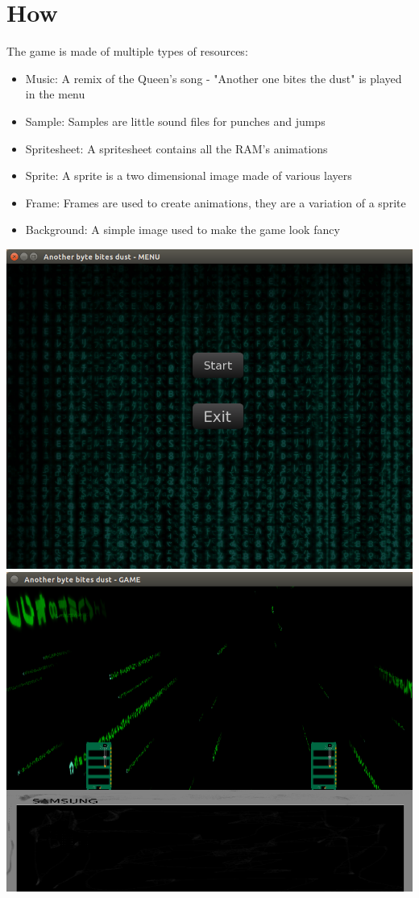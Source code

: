 \documentclass[12pt]{report}
\begin{document}
\section{How}
The game is made of multiple types of resources:
\begin{itemize}
\item Music: A remix of the Queen's song - "Another one bites the dust" is played in the menu
\item Sample: Samples are little sound files for punches and jumps
\item Spritesheet: A spritesheet contains all the RAM's animations
\item Sprite: A sprite is a two dimensional image made of various layers
\item Frame: Frames are used to create animations, they are a variation of a sprite
\item Background: A simple image used to make the game look fancy
\end{itemize}
\includegraphics[scale=0.4]{menu.png}
\\
\includegraphics[scale=0.4]{game.png}
\end{document}
